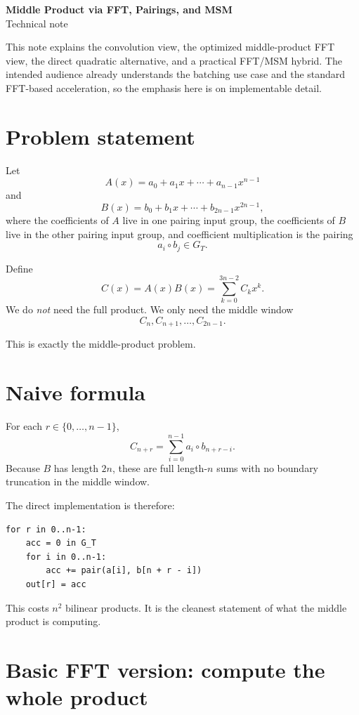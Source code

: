 \documentclass[11pt]{article}
\newcommand{\GT}{G_T}
\begin{document}
\begin{center}
  {\LARGE \textbf{Middle Product via FFT, Pairings, and MSM}}\\[0.5em]
  {\large Technical note}\\[0.75em]
\end{center}

\noindent
This note explains the convolution view, the optimized middle-product FFT view, the direct quadratic alternative, and a practical FFT/MSM hybrid. The intended audience already understands the batching use case and the standard FFT-based acceleration, so the emphasis here is on implementable detail.

\section{Problem statement}

Let
\[
A(x) = a_0 + a_1 x + \cdots + a_{n-1} x^{n-1}
\]
and
\[
B(x) = b_0 + b_1 x + \cdots + b_{2n-1} x^{2n-1},
\]
where the coefficients of $A$ live in one pairing input group, the coefficients of $B$ live in the other pairing input group, and coefficient multiplication is the pairing
\[
a_i \circ b_j \in \GT.
\]

Define
\[
C(x) = A(x)B(x) = \sum_{k=0}^{3n-2} C_k x^k.
\]
We do \emph{not} need the full product. We only need the middle window
\[
C_n, C_{n+1}, \dots, C_{2n-1}.
\]

This is exactly the middle-product problem.

\section{Naive formula}

For each $r \in \{0,\dots,n-1\}$,
\[
C_{n+r} = \sum_{i=0}^{n-1} a_i \circ b_{n+r-i}.
\]
Because $B$ has length $2n$, these are full length-$n$ sums with no boundary truncation in the middle window.

The direct implementation is therefore:

\begin{lstlisting}
for r in 0..n-1:
    acc = 0 in G_T
    for i in 0..n-1:
        acc += pair(a[i], b[n + r - i])
    out[r] = acc
\end{lstlisting}

This costs $n^2$ bilinear products. It is the cleanest statement of what the middle product is computing.

\section{Basic FFT version: compute the whole product}
\end{document}
